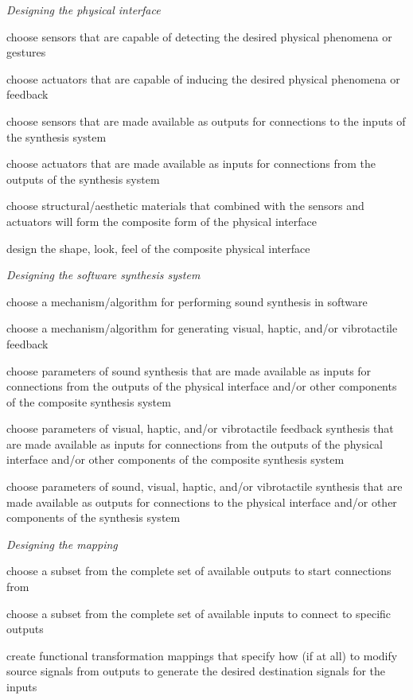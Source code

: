 \begin{description}
\item \emph{Designing the physical interface}
\begin{description}
\item choose sensors that are capable of detecting the desired physical phenomena or gestures
\item choose actuators that are capable of inducing the desired physical phenomena or feedback
\item choose sensors that are made available as outputs for connections to the inputs of the synthesis system
\item choose actuators that are made available as inputs for connections from the outputs of the synthesis system
\item choose structural/aesthetic materials that combined with the sensors and actuators will form the composite form of the physical interface
\item design the shape, look, feel of the composite physical interface
\end{description}
\item \emph{Designing the software synthesis system}
\begin{description}
\item choose a mechanism/algorithm for performing sound synthesis in software
\item choose a mechanism/algorithm for generating visual, haptic, and/or vibrotactile feedback
\item choose parameters of sound synthesis that are made available as inputs for connections from the outputs of the physical interface and/or other components of the composite synthesis system
\item choose parameters of visual, haptic, and/or vibrotactile feedback synthesis that are made available as inputs for connections from the outputs of the physical interface and/or other components of the composite synthesis system
\item choose parameters of sound, visual, haptic, and/or vibrotactile synthesis that are made available as outputs for connections to the physical interface and/or other components of the synthesis system
\end{description}
\item \emph{Designing the mapping}
\begin{description}
	\item choose a subset from the complete set of available outputs to start connections from
	\item choose a subset from the complete set of available inputs to connect to specific outputs
	\item create functional transformation mappings that specify how (if at all) to modify source signals from outputs to generate the desired destination signals for the inputs
\end{description}
\end{description}

